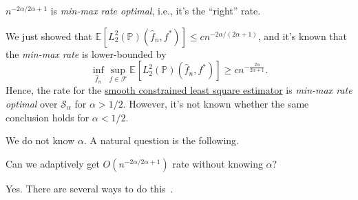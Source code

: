 \begin{remark}\label{rmk:min-max-rate-optimal}
	\(n^{-2\alpha / 2\alpha +1}\) is \emph{min-max rate optimal}, i.e., it's the ``right'' rate.
\end{remark}
\begin{explanation}
	We just showed that \(\mathbb{E}_{}[ L_2^2 (\mathbb{P} ) ( \hat{f} _n, f^{\ast} )] \leq c n^{-2\alpha / (2\alpha + 1)}\), and it's known that the \emph{min-max rate} is lower-bounded by
	\[
		\inf _{\hat{f} _n} \sup _{f \in \mathscr{F} } \mathbb{E}_{}\left[ L_2^2(\mathbb{P} ) (\hat{f} _n, f^{\ast} )\right] \geq c n^{-\frac{2\alpha}{2\alpha + 1}}.
	\]
	Hence, the rate for the \hyperref[prb:smooth-LS]{smooth constrained least square estimator} is \emph{min-max rate optimal} over \(\mathcal{S} _\alpha \) for \(\alpha > 1 / 2\). However, it's not known whether the same conclusion holds for \(\alpha < 1 / 2\).
\end{explanation}

We do not know \(\alpha \). A natural question is the following.

\begin{problem*}
	Can we adaptively get \(O(n^{-2\alpha / 2\alpha + 1})\) rate without knowing \(\alpha \)?
\end{problem*}
\begin{answer}
	Yes. There are several ways to do this~\cite{tsybakov2008introduction}.
\end{answer}